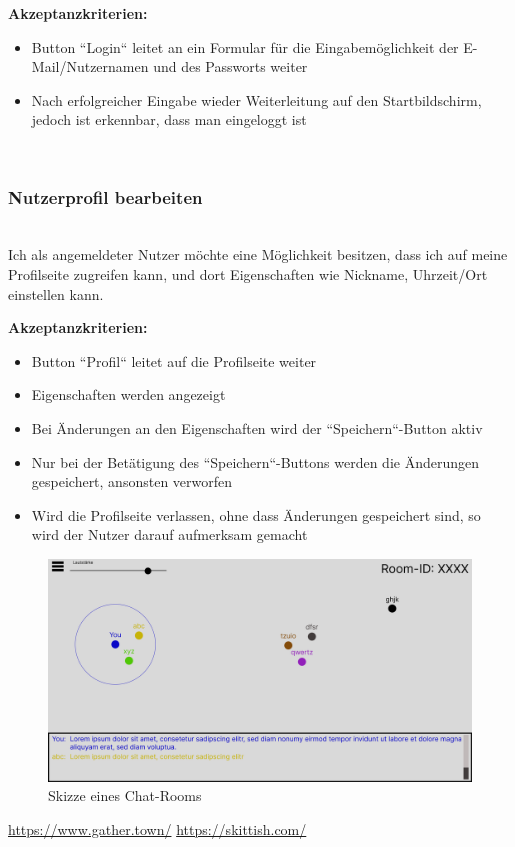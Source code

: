 \documentclass[conference]{IEEEtran}
\begin{document}
	\textbf{Akzeptanzkriterien:}
	\begin{itemize}
		\item Button ``Login`` leitet an ein Formular für die Eingabemöglichkeit der E-Mail/Nutzernamen und des Passworts weiter
		\item Nach erfolgreicher Eingabe wieder Weiterleitung auf den Startbildschirm, jedoch ist erkennbar, dass man eingeloggt ist
	\end{itemize}
	
	\ \\
	\subsubsection{Nutzerprofil bearbeiten}
	\ \\
	Ich als angemeldeter Nutzer möchte eine Möglichkeit besitzen, dass ich auf meine Profilseite zugreifen kann, und dort Eigenschaften wie Nickname, Uhrzeit/Ort einstellen kann.
	
	\textbf{Akzeptanzkriterien:}
	\begin{itemize}
		\item Button ``Profil`` leitet auf die Profilseite weiter
		\item Eigenschaften werden angezeigt
		\item Bei Änderungen an den Eigenschaften wird der ``Speichern``-Button aktiv
		\item Nur bei der Betätigung des ``Speichern``-Buttons werden die Änderungen gespeichert, ansonsten verworfen
		\item Wird die Profilseite verlassen, ohne dass Änderungen gespeichert sind, so wird der Nutzer darauf aufmerksam gemacht
	\end{itemize}
	
	\begin{figure}[htbp]
		\centering
		\includegraphics[width=\linewidth]{skizze.png}
		\caption{Skizze eines Chat-Rooms}
	\end{figure}
	
	
	\begin{thebibliography}{99}
		
	 \url{https://www.gather.town/} 
	 \url{https://skittish.com/}
	
	
	\end{thebibliography}
\end{document}
